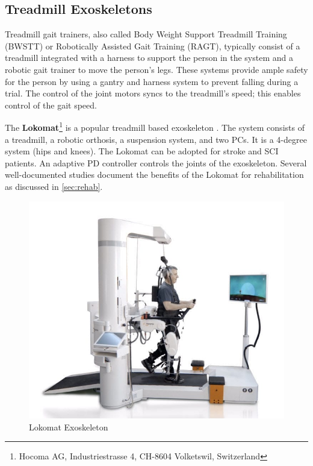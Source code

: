\subsection{Treadmill Exoskeletons}

Treadmill gait trainers, also called Body Weight Support Treadmill Training (BWSTT) or Robotically Assisted Gait Training (RAGT), typically consist of a treadmill integrated with a harness to support the person in the system and a robotic gait trainer to move the person's legs. These systems provide ample safety for the person by using a gantry and harness system to prevent falling during a trial. The control of the joint motors syncs to the treadmill's speed; this enables control of the gait speed.
 
The \textbf{Lokomat}\footnote{Hocoma AG, Industriestrasse 4, CH-8604 Volketswil, Switzerland } is a popular treadmill based exoskeleton \cite{jezernik2003robotic}. The system consists of a treadmill, a robotic orthosis, a suspension system, and two PCs. It is a 4-degree system (hips and knees). The Lokomat can be adopted for stroke and SCI patients. An adaptive PD controller controls the joints of the exoskeleton. Several well-documented studies document the benefits of the Lokomat for rehabilitation as discussed in \autoref{sec:rehab}.
 
 
\begin{figure}[H]
    \centering
    \includegraphics[scale=0.25]{images/background/loko.jpg}
    \caption[Lokomat Exoskeleton]{Lokomat Exoskeleton}
    \label{fig:loko}
\end{figure} 
 
